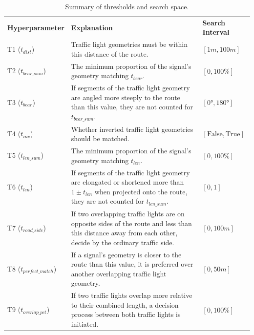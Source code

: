 \begin{table}[h]
\caption{Summary of thresholds and search space.}
\begin{tabular}{@{}lp{8cm}l@{}}
\toprule
\textbf{Hyperparameter}  & \textbf{Explanation} & \textbf{Search Interval} \\
T1 ($t_{dist}$) & Traffic light geometries must be within this distance of the route. & $[1m, 100m]$ \\
T2 ($t_{bear\_sum}$) & The minimum proportion of the signal's geometry matching $t_{bear}$. & $[0, 100\%]$ \\
T3 ($t_{bear}$) & If segments of the traffic light geometry are angled more steeply to the route than this value, they are not counted for $t_{bear\_sum}$. & $[0°, 180°]$ \\
T4 ($t_{inv}$) & Whether inverted traffic light geometries should be matched. & $[\text{False}, \text{True}]$ \\
T5 ($t_{len\_sum}$) & The minimum proportion of the signal's geometry matching $t_{len}$. & $[0, 100\%]$ \\
T6 ($t_{len}$) & If segments of the traffic light geometry are elongated or shortened more than $1 \pm t_{len}$ when projected onto the route, they are not counted for $t_{len\_sum}$. & $[0, 1]$\\
T7 ($t_{road\_side}$) & If two overlapping traffic lights are on opposite sides of the route and less than this distance away from each other, decide by the ordinary traffic side. & $[0, 100m]$ \\
T8 ($t_{perfect\_match}$) & If a signal's geometry is closer to the route than this value, it is preferred over another overlapping traffic light geometry. & $[0, 50m]$ \\
T9 ($t_{overlap\_pct}$) & If two traffic lights overlap more relative to their combined length, a decision process between both traffic lights is initiated. & $[0, 100\%]$ \\
\bottomrule
\end{tabular}
\label{tab:hyperparameter-space}
\end{table}

